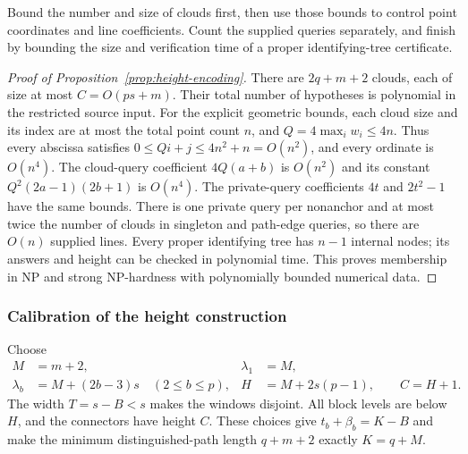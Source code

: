 \begin{proofstrategy}
Bound the number and size of clouds first, then use those bounds to
control point coordinates and line coefficients. Count the supplied
queries separately, and finish by bounding the size and verification
time of a proper identifying-tree certificate.
\end{proofstrategy}
\begin{proof}[Proof of Proposition~\ref{prop:height-encoding}]
There are $2q+m+2$ clouds, each of size at most
$C=O(ps+m)$. Their total number of hypotheses is polynomial in
the restricted source input. For the explicit geometric bounds, each
cloud size and its index are at most the total point count $n$,
and $Q=4\max_iw_i\le4n$. Thus every abscissa satisfies
$0\le Qi+j\le4n^2+n=O(n^2)$, and every ordinate is $O(n^4)$.
The cloud-query coefficient $4Q(a+b)$ is $O(n^2)$ and its
constant $Q^2(2a-1)(2b+1)$ is $O(n^4)$. The private-query
coefficients $4t$ and $2t^2-1$ have the same bounds. There is
one private query per nonanchor and at most twice the number of
clouds in singleton and path-edge queries, so there are $O(n)$
supplied lines. Every proper identifying tree has $n-1$ internal nodes;
its answers and height can be checked in polynomial time.
This proves membership in NP and strong NP-hardness with
polynomially bounded numerical data.
\end{proof}

\subsubsection{Calibration of the height construction}
\label{sec:height-hardness-calibration}

\begin{parameterchoice}
Choose
\[
 \begin{aligned}
 M&=m+2,&\lambda_1&=M,\\
 \lambda_b&=M+(2b-3)s\quad(2\le b\le p),&
 H&=M+2s(p-1),\qquad C=H+1.
 \end{aligned}
\]
The width $T=s-B<s$ makes the windows disjoint. All block levels are
below $H$, and the connectors have height $C$. These choices give
$t_b+\beta_b=K-B$ and make the minimum distinguished-path length
$q+m+2$ exactly $K=q+M$.
\end{parameterchoice}

